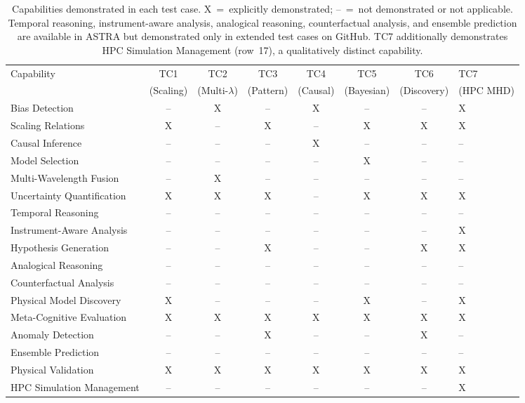 \documentclass[usenatbib]{rasti}
\begin{document}
\begin{table}
\caption{Capabilities demonstrated in each test case. X~=~explicitly demonstrated; --~=~not demonstrated or not applicable. Temporal reasoning, instrument-aware analysis, analogical reasoning, counterfactual analysis, and ensemble prediction are available in ASTRA but demonstrated only in extended test cases on GitHub. TC7 additionally demonstrates HPC Simulation Management (row~17), a qualitatively distinct capability.}
\label{tab:capabilities}
\centering
\begin{tabular}{lccccccl}
\hline
Capability & TC1 & TC2 & TC3 & TC4 & TC5 & TC6 & TC7 \\
& (Scaling) & (Multi-$\lambda$) & (Pattern) & (Causal) & (Bayesian) & (Discovery) & (HPC MHD) \\
\hline
Bias Detection              & -- & X  & -- & X  & -- & -- & X  \\
Scaling Relations           & X  & -- & X  & -- & X  & X  & X  \\
Causal Inference            & -- & -- & -- & X  & -- & -- & -- \\
Model Selection             & -- & -- & -- & -- & X  & -- & -- \\
Multi-Wavelength Fusion     & -- & X  & -- & -- & -- & -- & -- \\
Uncertainty Quantification  & X  & X  & X  & -- & X  & X  & X  \\
Temporal Reasoning          & -- & -- & -- & -- & -- & -- & -- \\
Instrument-Aware Analysis   & -- & -- & -- & -- & -- & -- & X  \\
Hypothesis Generation       & -- & -- & X  & -- & -- & X  & X  \\
Analogical Reasoning        & -- & -- & -- & -- & -- & -- & -- \\
Counterfactual Analysis     & -- & -- & -- & -- & -- & -- & -- \\
Physical Model Discovery    & X  & -- & -- & -- & X  & -- & X  \\
Meta-Cognitive Evaluation   & X  & X  & X  & X  & X  & X  & X  \\
Anomaly Detection           & -- & -- & X  & -- & -- & X  & -- \\
Ensemble Prediction         & -- & -- & -- & -- & -- & -- & -- \\
Physical Validation         & X  & X  & X  & X  & X  & X  & X  \\
\hline
HPC Simulation Management   & -- & -- & -- & -- & -- & -- & X  \\
\hline
\end{tabular}
\end{table}
\end{document}
